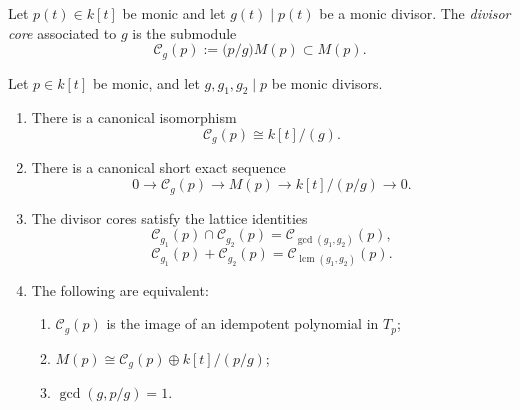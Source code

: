 \begin{definition}
Let \(p(t)\in k[t]\) be monic and let \(g(t)\mid p(t)\) be a monic divisor.
The \emph{divisor core} associated to \(g\) is the submodule
\[
\mathcal C_g(p):=\bigl(p/g\bigr)M(p)\subset M(p).
\]
\end{definition}

\begin{theorem}
\label{thm:divisor-core-calculus}
Let \(p\in k[t]\) be monic, and let \(g,g_1,g_2\mid p\) be monic divisors.

\begin{enumerate}[label=\textup{(\roman*)}]
\item There is a canonical isomorphism
\[
\mathcal C_g(p)\cong k[t]/(g).
\]

\item There is a canonical short exact sequence
\[
0\longrightarrow \mathcal C_g(p)\longrightarrow M(p)\longrightarrow k[t]/(p/g)\longrightarrow 0.
\]

\item The divisor cores satisfy the lattice identities
\[
\mathcal C_{g_1}(p)\cap \mathcal C_{g_2}(p)=\mathcal C_{\gcd(g_1,g_2)}(p),
\]
\[
\mathcal C_{g_1}(p)+\mathcal C_{g_2}(p)=\mathcal C_{\operatorname{lcm}(g_1,g_2)}(p).
\]

\item The following are equivalent:
\begin{enumerate}[label=\textup{(\alph*)}]
\item \(\mathcal C_g(p)\) is the image of an idempotent polynomial in \(T_p\);
\item \(M(p)\cong \mathcal C_g(p)\oplus k[t]/(p/g)\);
\item \(\gcd(g,p/g)=1\).
\end{enumerate}
\end{enumerate}
\end{theorem}

